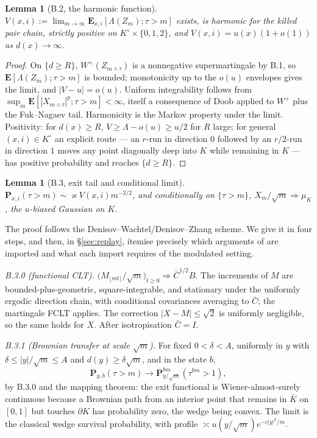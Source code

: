 \documentclass[11pt]{article}
\newtheorem{lemma}[theorem]{Lemma}
\theoremstyle{definition}
\newcommand{\E}{\mathbf{E}}
\renewcommand{\Pr}{\mathbf{P}}
\begin{document}
\begin{lemma}[B.2, the harmonic function]
$V(x,i):=\lim_{m\to\infty}\E_{x,i}[\Lambda(Z_m);\tau>m]$ exists, is harmonic
for the killed pair chain, strictly positive on $K^{\circ}\times\{0,1,2\}$, and
$V(x,i)=u(x)(1+o(1))$ as $d(x)\to\infty$.
\end{lemma}

\begin{proof}
On $\{d\ge R\}$, $W^{+}(Z_{m\wedge\tau})$ is a nonnegative supermartingale by
B.1, so $\E[\Lambda(Z_m);\tau>m]$ is bounded; monotonicity up to the $o(u)$
envelopes gives the limit, and $|V-u|=o(u)$. Uniform integrability follows from
$\sup_m\E[|X_{m\wedge\tau}|^{p};\tau>m]<\infty$, itself a consequence of Doob
applied to $W^{+}$ plus the Fuk--Nagaev tail. Harmonicity is the Markov
property under the limit. Positivity: for $d(x)\ge R$, $V\ge\Lambda-o(u)\ge u/2$
for $R$ large; for general $(x,i)\in K^{\circ}$ an explicit route --- an
$r$-run in direction $0$ followed by an $r/2$-run in direction $1$ moves any
point diagonally deep into $K$ while remaining in $K$ --- has positive
probability and reaches $\{d\ge R\}$.
\end{proof}

\begin{lemma}[B.3, exit tail and conditional limit]
$\Pr_{x,i}(\tau>m)\sim\varkappa V(x,i)m^{-3/2}$, and conditionally on
$\{\tau>m\}$, $X_m/\sqrt m\Rightarrow\mu_K$, the $u$-biased Gaussian on $K$.
\end{lemma}

The proof follows the Denisov--Wachtel/Denisov--Zhang scheme. We give it in
four steps, and then, in \S\ref{sec:replay}, itemise precisely which arguments
of \cite{DZ} are imported and what each import requires of the modulated
setting.

\emph{B.3.0 (functional CLT).} $\bigl(M_{\lfloor mt\rfloor}/\sqrt m\bigr)_{t\ge0}
\Rightarrow\bar C^{1/2}B$. The increments of $M$ are bounded-plus-geometric,
square-integrable, and stationary under the uniformly ergodic direction chain,
with conditional covariances averaging to $\bar C$; the martingale FCLT
applies. The correction $|X-M|\le\sqrt2$ is uniformly negligible, so the same
holds for $X$. After isotropisation $\bar C=I$.

\emph{B.3.1 (Brownian transfer at scale $\sqrt m$).} For fixed
$0<\delta<A$, uniformly in $y$ with $\delta\le|y|/\sqrt m\le A$ and
$d(y)\ge\delta\sqrt m$, and in the state $b$,
\[
  \Pr_{y,b}(\tau>m)\longrightarrow\Pr^{bm}_{y/\sqrt m}(\tau^{bm}>1),
\]
by B.3.0 and the mapping theorem: the exit functional is Wiener-almost-surely
continuous because a Brownian path from an interior point that remains in
$\bar K$ on $[0,1]$ but touches $\partial K$ has probability zero, the wedge
being convex. The limit is the classical wedge survival probability, with
profile $\asymp u(y/\sqrt m)e^{-c|y|^{2}/m}$.
\end{document}
